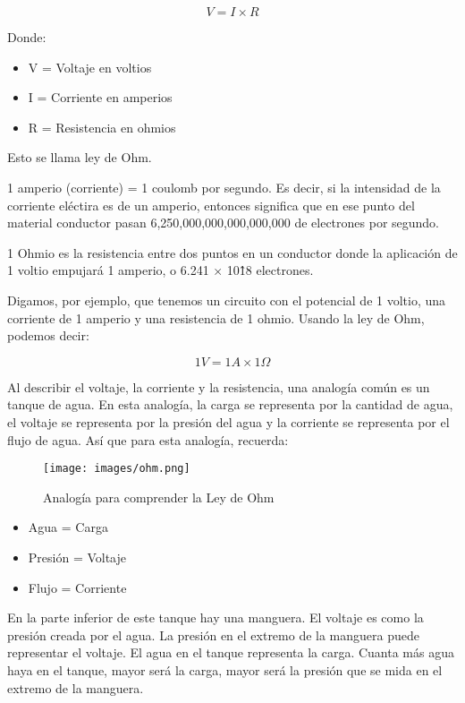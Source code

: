 \documentclass[output=paper, 
colorlinks,
citecolor=brown,
newtxmath
]{langscibook}
\begin{document}
\[V = I \times R\]

Donde:

\begin{itemize}
  \setlength\itemsep{-0.5em}
\item V = Voltaje en voltios
\item I = Corriente en amperios 
\item R = Resistencia en ohmios
\end{itemize}

Esto se llama ley de Ohm. 

1 amperio (corriente) = 1 coulomb por segundo. Es decir, si la intensidad de la corriente eléctira es de un amperio, entonces significa que en ese punto del material conductor pasan 6,250,000,000,000,000,000 de electrones por segundo. 

1 Ohmio es la resistencia entre dos puntos en un conductor donde la aplicación de 1 voltio empujará 1 amperio, o 6.241 × 10\^18 electrones. 


Digamos, por ejemplo, que tenemos un circuito con el potencial de 1 voltio, una corriente de 1 amperio y una resistencia de 1 ohmio. Usando la ley de Ohm, podemos decir:

\[1V = 1A \times 1Ω\]


Al describir el voltaje, la corriente y la resistencia, una analogía común es un tanque de agua. En esta analogía, la carga se representa por la cantidad de agua, el voltaje se representa por la presión del agua y la corriente se representa por el flujo de agua. Así que para esta analogía, recuerda:

\begin{figure}
\texttt{[image: images/ohm.png]}
\caption{Analogía para comprender la Ley de Ohm}
\label{fig:unidades}
\end{figure}

\begin{itemize}
  \setlength\itemsep{-0.5em}
\item Agua = Carga
\item Presión = Voltaje
\item Flujo = Corriente
\end{itemize}

En la parte inferior de este tanque hay una manguera. El voltaje es como la presión creada por el agua. La presión en el extremo de la manguera puede representar el voltaje. El agua en el tanque representa la carga. Cuanta más agua haya en el tanque, mayor será la carga, mayor será la presión que se mida en el extremo de la manguera.
\end{document}
